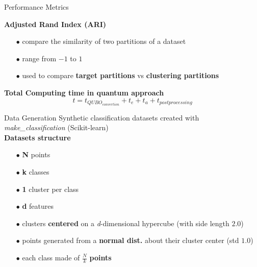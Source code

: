 		\begin{frame}{Performance Metrics}
						
			\textbf{Adjusted Rand Index (ARI)}
			\begin{itemize}
				\item[$\bullet$] compare the similarity of two partitions of a dataset
				\item[$\bullet$] range from $-1$ to $1$ 
				\item[$\bullet$] used to compare \textbf{target partitions} vs \textbf{clustering partitions} 
			\end{itemize}
			
			\textbf{Total Computing time in quantum approach}
			\begin{equation}
				t = t_{QUBO_{convertion}} + t_{e} + t_{a} + t_{postprocessing}
			\end{equation}

		
		\end{frame}

		\begin{frame}{Data Generation}
			Synthetic classification datasets created with \textit{make\_classification} (Scikit-learn)	\\
			\textbf{Datasets structure}
			\begin{itemize}
				\item[$\bullet$] \textbf{N} points	
				\item[$\bullet$] \textbf{k} classes	
				\item[$\bullet$] \textbf{1} cluster per class	
				\item[$\bullet$] \textbf{d} features 
				\item[$\bullet$] clusters \textbf{centered} on a \textit{d}-dimensional hypercube (with side length $2.0$)  
				\item[$\bullet$] points generated from a \textbf{normal dist.} about their cluster center (std $1.0$)   
				\item[$\bullet$] each class made of $\frac{N}{k}$ \textbf{points}   
			\end{itemize}

			
		\end{frame}

